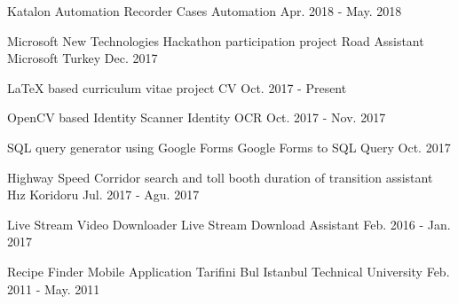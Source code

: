 \begin{cventries}
  \cventry
    {Katalon Automation Recorder Cases} %
    {Automation} %
    {} %
    {Apr. 2018 - May. 2018} %
    {}

  \cventry
    {Microsoft New Technologies Hackathon participation project} %
    {Road Assistant} %
    {Microsoft Turkey} %
    {Dec. 2017} %
    {}

  \cventry
    {LaTeX based curriculum vitae project} %
    {CV} %
    {} %
    {Oct. 2017 - Present} %
    {}

  \cventry
    {OpenCV based Identity Scanner} %
    {Identity OCR} %
    {} %
    {Oct. 2017 - Nov. 2017} %
    {}

  \cventry
    {SQL query generator using Google Forms} %
    {Google Forms to SQL Query} %
    {} %
    {Oct. 2017} %
    {}

  \cventry
    {Highway Speed Corridor search and toll booth duration of transition assistant} %
    {Hız Koridoru} %
    {} %
    {Jul. 2017 - Agu. 2017} %
    {}

  \cventry
    {Live Stream Video Downloader} %
    {Live Stream Download Assistant} %
    {} %
    {Feb. 2016 - Jan. 2017} %
    {}

  \cventry
    {Recipe Finder Mobile Application} %
    {Tarifini Bul} %
    {Istanbul Technical University} %
    {Feb. 2011 - May. 2011} %
    {}

\end{cventries}
